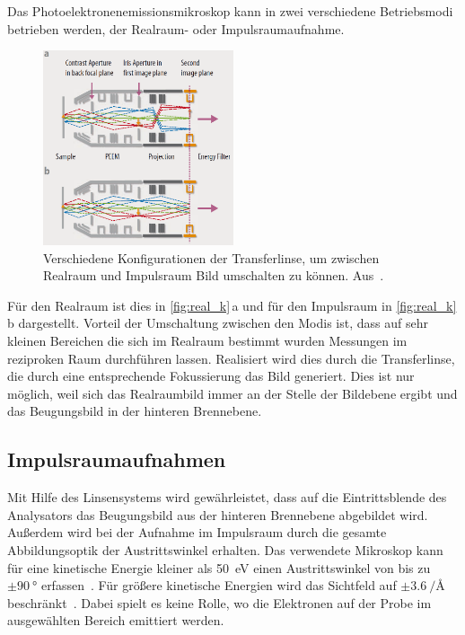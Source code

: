         Das Photoelektronenemissionsmikroskop kann in zwei verschiedene Betriebsmodi betrieben werden, der Realraum- oder Impulsraumaufnahme.
        \begin{figure}
            \centering
            \includegraphics[width=0.5\textwidth]{Real_k.PNG}
            \caption{Verschiedene Konfigurationen der Transferlinse, um zwischen Realraum und Impulsraum Bild umschalten zu können. Aus~\cite{Focus}.}
            \label{fig:real_k}
        \end{figure}
        Für den Realraum ist dies in \autoref{fig:real_k}\,a und für den Impulsraum in \autoref{fig:real_k}\,b dargestellt.
        Vorteil der Umschaltung zwischen den Modis ist, dass auf sehr kleinen Bereichen die sich im Realraum bestimmt wurden Messungen im reziproken Raum durchführen lassen.
        Realisiert wird dies durch die Transferlinse, die durch eine entsprechende Fokussierung das Bild generiert.
        Dies ist nur möglich, weil sich das Realraumbild immer an der Stelle der Bildebene ergibt und das Beugungsbild in der hinteren Brennebene.
        

        \subsection{Impulsraumaufnahmen}
            Mit Hilfe des Linsensystems wird gewährleistet, dass auf die Eintrittsblende des Analysators das Beugungsbild aus der hinteren Brennebene abgebildet wird.
            Außerdem wird bei der Aufnahme im Impulsraum durch die gesamte Abbildungsoptik der Austrittswinkel erhalten.
            Das verwendete Mikroskop kann für eine kinetische Energie kleiner als \SI{50}{\electronvolt} einen Austrittswinkel von bis zu $\pm\SI{90}{\degree}$ erfassen~\cite{SPECS-MM}.
            Für größere kinetische Energien wird das Sichtfeld auf $\pm\SI[per-mode=reciprocal]{3.6}{\per\angstrom}$ beschränkt~\cite{SPECS-MM}.
            Dabei spielt es keine Rolle, wo die Elektronen auf der Probe im ausgewählten Bereich emittiert werden.

